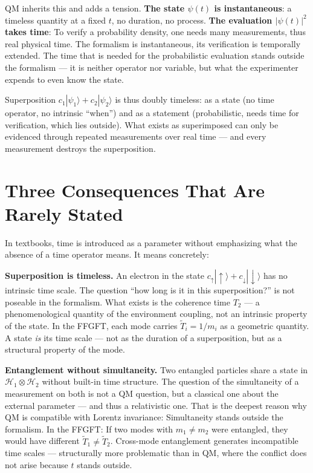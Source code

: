 QM inherits this and adds a tension. \textbf{The state
$\psi(t)$ is instantaneous}: a timeless quantity at a fixed $t$, no
duration, no process. \textbf{The evaluation $|\psi(t)|^2$ takes time}:
To verify a probability density, one needs
many measurements, thus real physical time. The formalism is
instantaneous, its verification is temporally extended. The time that
is needed for the probabilistic evaluation stands outside the
formalism --- it is neither operator nor variable, but what
the experimenter expends to even know the state.

Superposition $c_1|\psi_1\rangle+c_2|\psi_2\rangle$ is thus doubly
timeless: as a state (no time operator, no intrinsic
\enquote{when}) and as a statement (probabilistic, needs time for verification, which lies outside).
What exists as superimposed can only be evidenced through repeated measurements over real time --- and
every measurement destroys the superposition.

\section{Three Consequences That Are Rarely Stated}

In textbooks, time is introduced as a parameter without emphasizing
what the absence of a time operator means. It means concretely:

\textbf{Superposition is timeless.} An electron in the state
$c_\uparrow|\uparrow\rangle+c_\downarrow|\downarrow\rangle$ has no
intrinsic time scale. The question \enquote{how long is it in this
superposition?} is not poseable in the formalism. What exists is
the coherence time $T_2$ --- a phenomenological quantity of the
environment coupling, not an intrinsic property of the state. In the
FFGFT, each mode carries $\tilde T_i = 1/m_i$ as a geometric quantity. A
state \emph{is} its time scale --- not as the duration of a
superposition, but as a structural property of the mode.

\textbf{Entanglement without simultaneity.} Two entangled
particles share a state in $\mathcal{H}_1\otimes\mathcal{H}_2$
without built-in time structure. The question of the simultaneity
of a measurement on both is not a QM question, but a classical
one about the external parameter --- and thus a relativistic one. That is
the deepest reason why QM is compatible with Lorentz invariance:
Simultaneity stands outside the formalism. In the FFGFT: If
two modes with $m_1\neq m_2$ were entangled, they would have different
$\tilde T_1\neq\tilde T_2$. Cross-mode entanglement generates
incompatible time scales --- structurally more problematic than in QM,
where the conflict does not arise because $t$ stands outside.

